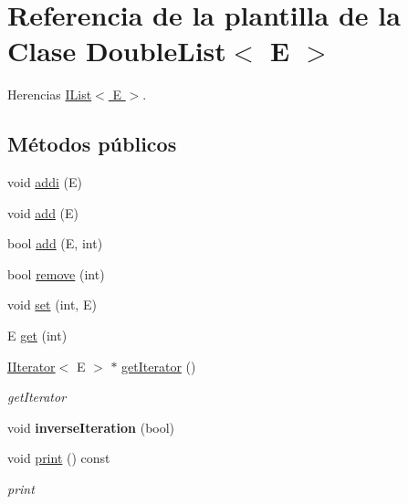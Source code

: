 \hypertarget{classDoubleList}{\section{Referencia de la plantilla de la Clase Double\-List$<$ E $>$}
\label{classDoubleList}
}


Herencias \hyperlink{classIList}{I\-List$<$ E $>$}.

\subsection*{Métodos públicos}
\begin{DoxyCompactItemize}
\item 
void \hyperlink{classDoubleList_a9924458cf1416df8243b4f857b027da7}{addi} (E)
\item 
void \hyperlink{classDoubleList_adb96e6908d3d564722225b848350aa82}{add} (E)
\item 
bool \hyperlink{classDoubleList_a84e3bb8be7d67b43dd3b63d5a47f80ed}{add} (E, int)
\item 
bool \hyperlink{classDoubleList_a844c2c4c3b8260bd58ab94307359fb62}{remove} (int)
\item 
void \hyperlink{classDoubleList_a3c95ac3c3190b347c4a343776264bf67}{set} (int, E)
\item 
E \hyperlink{classDoubleList_a230a8c9c574abe9c72f8daae35127d9c}{get} (int)
\item 
\hyperlink{classIIterator}{I\-Iterator}$<$ E $>$ $\ast$ \hyperlink{classDoubleList_aa14e383a97e054016a6c5178165b20df}{get\-Iterator} ()
\begin{DoxyCompactList}\small\item\em get\-Iterator \end{DoxyCompactList}\item 
\hypertarget{classDoubleList_a94d1ad5299452ea46839ba350ca501d1}{void {\bfseries inverse\-Iteration} (bool)}\label{classDoubleList_a94d1ad5299452ea46839ba350ca501d1}

\item 
\hypertarget{classDoubleList_ad3bf004a9bb2110da93fed1f1224d60e}{void \hyperlink{classDoubleList_ad3bf004a9bb2110da93fed1f1224d60e}{print} () const }\label{classDoubleList_ad3bf004a9bb2110da93fed1f1224d60e}

\begin{DoxyCompactList}\small\item\em print \end{DoxyCompactList}\end{DoxyCompactItemize}
